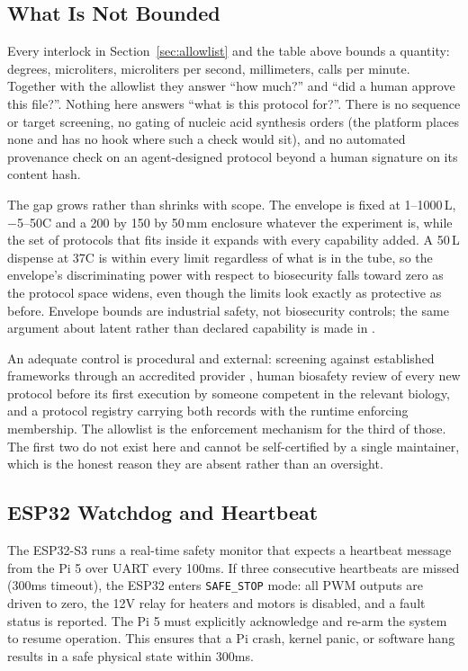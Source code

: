 \documentclass[11pt,letterpaper]{article}
\begin{document}
\subsection{What Is Not Bounded}
\label{sec:notbounded}

Every interlock in Section~\ref{sec:allowlist} and the table above bounds a quantity: degrees, microliters, microliters per second, millimeters, calls per minute. Together with the allowlist they answer ``how much?'' and ``did a human approve this file?''. Nothing here answers ``what is this protocol for?''. There is no sequence or target screening, no gating of nucleic acid synthesis orders (the platform places none and has no hook where such a check would sit), and no automated provenance check on an agent-designed protocol beyond a human signature on its content hash.

The gap grows rather than shrinks with scope. The envelope is fixed at 1--1000\,\textmu{}L, $-$5--50\textdegree{}C and a 200 by 150 by 50\,mm enclosure whatever the experiment is, while the set of protocols that fits inside it expands with every capability added. A 50\,\textmu{}L dispense at 37\textdegree{}C is within every limit regardless of what is in the tube, so the envelope's discriminating power with respect to biosecurity falls toward zero as the protocol space widens, even though the limits look exactly as protective as before. Envelope bounds are industrial safety, not biosecurity controls; the same argument about latent rather than declared capability is made in \cite{smith2026}.

An adequate control is procedural and external: screening against established frameworks through an accredited provider \cite{raixbiodesign2024,nasem2025}, human biosafety review of every new protocol before its first execution by someone competent in the relevant biology, and a protocol registry carrying both records with the runtime enforcing membership. The allowlist is the enforcement mechanism for the third of those. The first two do not exist here and cannot be self-certified by a single maintainer, which is the honest reason they are absent rather than an oversight.

\subsection{ESP32 Watchdog and Heartbeat}

\begin{hardwarebox}
The ESP32-S3 runs a real-time safety monitor that expects a heartbeat message from the Pi 5 over UART every 100ms. If three consecutive heartbeats are missed (300ms timeout), the ESP32 enters \texttt{SAFE\_STOP} mode: all PWM outputs are driven to zero, the 12V relay for heaters and motors is disabled, and a fault status is reported. The Pi 5 must explicitly acknowledge and re-arm the system to resume operation. This ensures that a Pi crash, kernel panic, or software hang results in a safe physical state within 300ms.
\end{hardwarebox}
\end{document}
